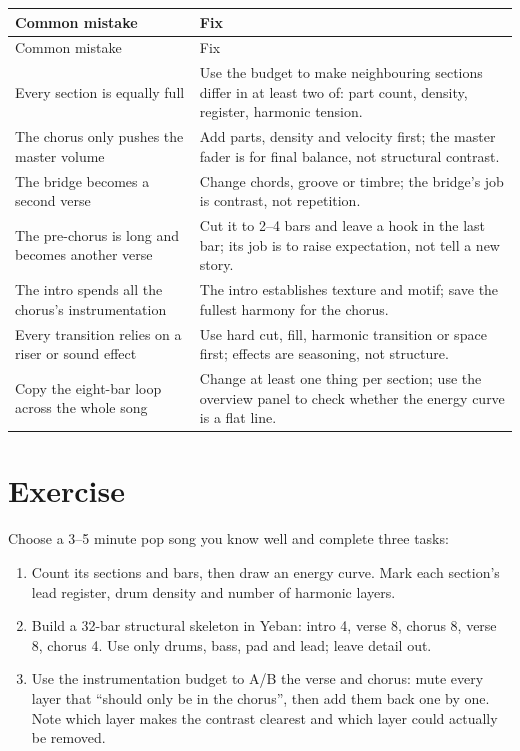 \begin{longtable}{p{}p{}}
\toprule
Common mistake & Fix \\
\midrule
\endfirsthead
\toprule
Common mistake & Fix \\
\midrule
\endhead
Every section is equally full & Use the budget to make neighbouring sections differ in at least two of: part count, density, register, harmonic tension. \\
The chorus only pushes the master volume & Add parts, density and velocity first; the master fader is for final balance, not structural contrast. \\
The bridge becomes a second verse & Change chords, groove or timbre; the bridge's job is contrast, not repetition. \\
The pre-chorus is long and becomes another verse & Cut it to 2--4 bars and leave a hook in the last bar; its job is to raise expectation, not tell a new story. \\
The intro spends all the chorus's instrumentation & The intro establishes texture and motif; save the fullest harmony for the chorus. \\
Every transition relies on a riser or sound effect & Use hard cut, fill, harmonic transition or space first; effects are seasoning, not structure. \\
Copy the eight-bar loop across the whole song & Change at least one thing per section; use the overview panel to check whether the energy curve is a flat line. \\
\bottomrule
\end{longtable}

\section{Exercise}
\label{sec:structure-exercise}

\begin{exercise}
Choose a 3--5 minute pop song you know well and complete three tasks:
\begin{enumerate}
\item Count its sections and bars, then draw an energy curve. Mark each section's lead register, drum density and number of harmonic layers.
\item Build a 32-bar structural skeleton in Yeban: intro 4, verse 8, chorus 8, verse 8, chorus 4. Use only drums, bass, pad and lead; leave detail out.
\item Use the instrumentation budget to A/B the verse and chorus: mute every layer that ``should only be in the chorus'', then add them back one by one. Note which layer makes the contrast clearest and which layer could actually be removed.
\end{enumerate}
\end{exercise}


